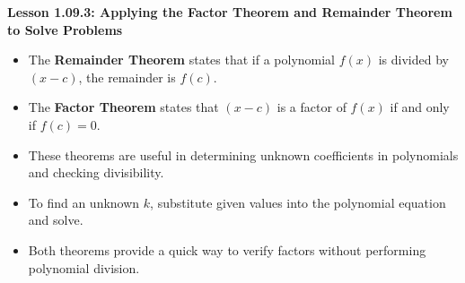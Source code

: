 \begin{center}
\textbf{Lesson 1.09.3: Applying the Factor Theorem and Remainder Theorem to Solve Problems}
\end{center}

\vspace*{-1.5ex}

\begin{itemize}
    \item The \textbf{Remainder Theorem} states that if a polynomial \( f(x) \) is divided by \( (x - c) \), the remainder is \( f(c) \).
    \item The \textbf{Factor Theorem} states that \( (x - c) \) is a factor of \( f(x) \) if and only if \( f(c) = 0 \).
    \item These theorems are useful in determining unknown coefficients in polynomials and checking divisibility.
    \item To find an unknown \( k \), substitute given values into the polynomial equation and solve.
    \item Both theorems provide a quick way to verify factors without performing polynomial division.
\end{itemize}
